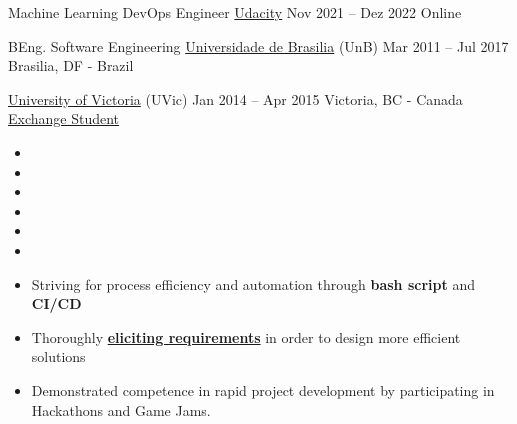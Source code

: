 \par
{}

\cveducation
{\normalsize Machine Learning DevOps Engineer}
{\href{https://confirm.udacity.com/VWERCDCT}{Udacity}}
{Nov 2021 -- Dez 2022}
{Online}
{}

\hfill

\cveducation
{\normalsize BEng. Software Engineering}
{\href{https://fga.unb.br/software}{Universidade de Brasilia} (UnB)}
{Mar 2011 -- Jul 2017}
{Brasilia, DF - Brazil}
{}

\cveducation
{}
{\href{https://www.uvic.ca/}{University of Victoria} (UVic)}
{Jan 2014 -- Apr 2015}
{Victoria, BC - Canada}
{\href{http://www.cienciasemfronteiras.gov.br/web/csf/o-programa}{Exchange Student}}
\smallskip


\hfill



\begin{itemize}
\item[\scriptsize\color{midaccent}\faComments] 
\item[\scriptsize\color{midaccent}\faComments] \par
\divider
\item[\scriptsize\color{midaccent}\faCode] 
\item[\scriptsize\color{midaccent}\faCode] 
\item[\scriptsize\color{midaccent}\faCode] \par
\item[\scriptsize\color{midaccent}\faCode] 
\end{itemize}

\hfill



{\justifying\color{description}
\begin{itemize}[leftmargin=0.61em]
\item[\color{midaccent}\faAngleRight] Striving for process efficiency and automation through {\bfseries\color{tech}bash script} and {\bfseries\color{tech}CI/CD}\smallskip\par
\item[\color{midaccent}\faAngleRight] Thoroughly {\bfseries\color{tech}\href{http://swebokwiki.org/Chapter_1:_Software_Requirements#Software_Requirements_Fundamentals}{eliciting requirements}} in order to design more efficient solutions\smallskip\par
\item[\color{midaccent}\faAngleRight] Demonstrated competence in rapid project development by participating in Hackathons and Game Jams.\smallskip\par

\end{itemize}
}

